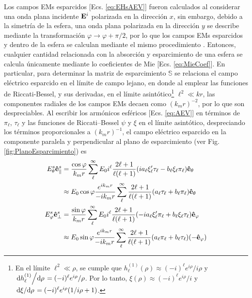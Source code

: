 Los campos EMs esparcidos [Ecs. \eqref{eq:EHsAEV}] fueron calculados al considerar una onda plana incidente $\vb{E}^i$ polarizada en la dirección $x$, sin embargo, debido a la simetría de la esfera, una onda plana polarizada en la dirección $y$ se describe mediante la transformación $\varphi\to\varphi+\pi/2$, por lo que los campos EMs esparcidos y dentro de la esfera se calculan mediante el mismo procedimiento \cite{bohren1998absorption}. Entonces, cualquier cantidad relacionada con la absorción y esparcimiento de una esfera se calcula únicamente mediante lo coeficientes de Mie [Ecs. \eqref{eq:MieCoef}]. En particular, para determinar la matriz de esparcimiento $\mathbb{S}$ se relaciona el campo eléctrico esparcido en el límite de campo lejano, en donde al emplear las funciones de Riccati-Bessel, y sus derivadas, en el límite asintótico\footnote{En el límite $\ell^2 \ll \rho$, se cumple que $h_\ell^{(1)}(\rho)\approx (-i)^\ell e^{i\rho}/i\rho$ y $\dv*{h_\ell^{(1)}}{\rho} = (-i)^\ell e^{i\rho}/\rho$. Por lo tanto,  $\xi(\rho)\approx (-i)^\ell e^{i\rho}/i$ y $\dv*{\xi}{\rho} = (-i)^\ell e^{i\rho}(1/i\rho + 1)$.} $\ell^2 \ll kr$, las componentes radiales de los campos EMs decaen como $(k_mr)^{-2}$, por lo que son despreciables. Al escribir los armónicos esféricos  [Ecs. \eqref{eq:AEV}] en términos de $\pi_\ell$, $\tau_\ell$ y las funciones de Riccati--Bessel $\psi$ y $\xi$ en el límite asintótico, despreciando los términos proporcionales a $(k_mr)^{-1}$, el campo eléctrico esparcido en la componente paralela y perpendicular al plano de esparcimiento (ver Fig. \ref{fig:PlanoEsparcimiento}) es
	\begin{align*}
	E_\theta^s \vu{e}_\parallel^s &=\frac{\cos\varphi}{k_mr}
								\sum_\ell^\infty E_0i^\ell\frac{2\ell+1}{\ell(\ell+1)}
						(i a_\ell\xi_\ell'\tau_\ell-b_\ell\xi_\ell\pi_\ell)\vu{e}_\theta\\
			&\approx E_0\cos\varphi\frac{e^{ik_mr}}{-ik_mr}\sum_\ell^\infty\frac{2\ell+1}{\ell(\ell+1)}
				( a_\ell \tau_\ell + b_\ell\pi_\ell )\vu{e}_\theta \\
		E_\varphi^s \vu{e}_\perp^s &= \frac{\sin\varphi}{k_mr}
							\sum_\ell^\infty E_0i^\ell\frac{2\ell+1}{\ell(\ell+1)}						
							(-ia_\ell\xi_\ell'\pi_\ell+b_\ell\xi_\ell\tau_\ell)\vu{e}_\varphi \\
			&\approx E_0\sin\varphi\frac{e^{ik_mr}}{-ik_mr}\sum_\ell^\infty\frac{2\ell+1}{\ell(\ell+1)}					(a_\ell\pi_\ell+b_\ell\tau_\ell)(-\vu{e}_\varphi)
	\end{align*}
